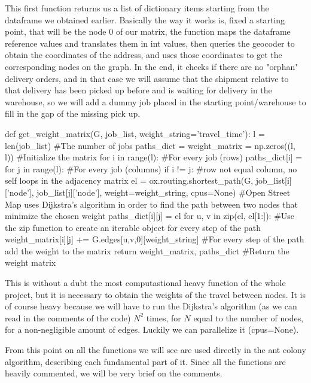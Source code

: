 \documentclass[titlepage]{article}
\begin{document}
This first function returns us a list of dictionary items starting from the dataframe we obtained earlier. Basically the way it works is, fixed a starting point, that will be the node $0$ of our matrix, the function maps the dataframe reference values and translates them in int values, then queries the geocoder to obtain the coordinates of the address, and uses those coordinates to get the corresponding nodes on the graph. In the end, it checks if there are no "orphan" delivery orders, and in that case we will assume that the shipment relative to that delivery has been picked up before and is waiting for delivery in the warehouse, so we will add a dummy job placed in the starting point/warehouse to fill in the gap of the missing pick up.

\begin{python}
def get_weight_matrix(G, job_list, weight_string='travel_time'):
    l = len(job_list) #The number of jobs
    paths_dict = {}
    weight_matrix = np.zeros((l, l)) #Initialize the matrix
    for i in range(l): #For every job (rows)
        paths_dict[i] = {}
        for j in range(l): #For every job (columns)
            if i != j: #row not equal column, no self loops in the adjacency matrix
                el = ox.routing.shortest_path(G, job_list[i]['node'], job_list[j]['node'], weight=weight_string, cpus=None) #Open Street Map uses Dijkstra's algorithm in order to find the path between two nodes that minimize the chosen weight
                paths_dict[i][j] = el
                for u, v in zip(el, el[1:]): #Use the zip function to create an iterable object for every step of the path
                    weight_matrix[i][j] += G.edges[u,v,0][weight_string] #For every step of the path add the weight to the matrix
    return weight_matrix, paths_dict #Return the weight matrix
\end{python}

This is without a dubt the most computastional heavy function of the whole project, but it is necessary to obtain the weights of the travel between nodes. It is of course heavy because we will have to run the Dijkstra's algorithm (as we can read in the comments of the code) $N^2$ times, for $N$ equal to the number of nodes, for a non-negligible amount of edges. Luckily we can parallelize it (cpus=None).

From this point on all the functions we will see are used directly in the ant colony algorithm, describing each fundamental part of it. Since all the functions are heavily commented, we will be very brief on the comments.
\end{document}
